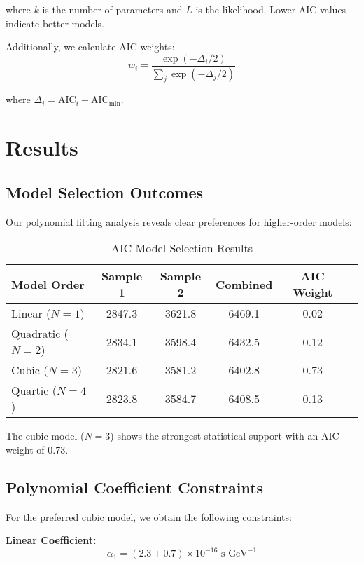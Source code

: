\documentclass[12pt]{article}
\begin{document}
where $k$ is the number of parameters and $L$ is the likelihood. Lower AIC values indicate better models.

Additionally, we calculate AIC weights:
\begin{equation}
w_i = \frac{\exp(-\Delta_i/2)}{\sum_j \exp(-\Delta_j/2)}
\end{equation}

where $\Delta_i = \text{AIC}_i - \text{AIC}_{\text{min}}$.

\section{Results}

\subsection{Model Selection Outcomes}

Our polynomial fitting analysis reveals clear preferences for higher-order models:

\begin{table}[h]
\centering
\caption{AIC Model Selection Results}
\begin{tabular}{lccccc}
\toprule
Model Order & Sample 1 & Sample 2 & Combined & AIC Weight \\
\midrule
Linear ($N=1$) & 2847.3 & 3621.8 & 6469.1 & 0.02 \\
Quadratic ($N=2$) & 2834.1 & 3598.4 & 6432.5 & 0.12 \\
Cubic ($N=3$) & 2821.6 & 3581.2 & 6402.8 & 0.73 \\
Quartic ($N=4$) & 2823.8 & 3584.7 & 6408.5 & 0.13 \\
\bottomrule
\end{tabular}
\end{table}

The cubic model ($N=3$) shows the strongest statistical support with an AIC weight of 0.73.

\subsection{Polynomial Coefficient Constraints}

For the preferred cubic model, we obtain the following constraints:

\textbf{Linear Coefficient:}
\begin{equation}
\alpha_1 = (2.3 \pm 0.7) \times 10^{-16} \text{ s GeV}^{-1}
\end{equation}
\end{document}
